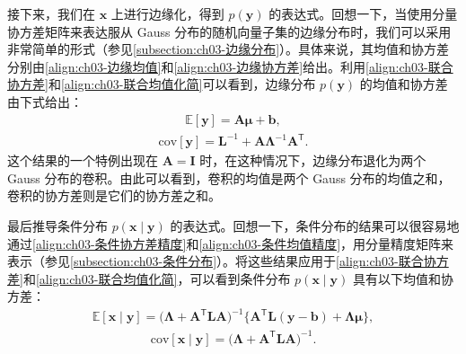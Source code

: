 \documentclass[../../main.tex]{subfiles}
\begin{document}
接下来，我们在 $\boldsymbol{x}$ 上进行边缘化，得到 $p(\boldsymbol{y})$ 的表达式。回想一下，当使用分量协方差矩阵来表达服从 Gauss 分布的随机向量子集的边缘分布时，我们可以采用非常简单的形式（参见\cref{subsection:ch03-边缘分布}）。具体来说，其均值和协方差分别由\eqref{align:ch03-边缘均值}和\eqref{align:ch03-边缘协方差}给出。利用\eqref{align:ch03-联合协方差}和\eqref{align:ch03-联合均值化简}可以看到，边缘分布 $p(\boldsymbol{y})$ 的均值和协方差由下式给出：
\begin{align}
\mathbb{E}[\boldsymbol{y}]=\boldsymbol{A}\boldsymbol{\mu}+\boldsymbol{b},
\label{align:ch03-边缘Bayes}
\end{align}
\begin{align}
\mathrm{cov}[\boldsymbol{y}]=\boldsymbol{L}^{-1}+\boldsymbol{A}\boldsymbol{\Lambda}^{-1}\boldsymbol{A}^{\mathsf{T}}.
\label{align:ch03-边缘Bayes协方差}
\end{align}
这个结果的一个特例出现在 $\boldsymbol{A}=\boldsymbol{I}$ 时，在这种情况下，边缘分布退化为两个 Gauss 分布的卷积。由此可以看到，卷积的均值是两个 Gauss 分布的均值之和，卷积的协方差则是它们的协方差之和。

最后推导条件分布 $p(\boldsymbol{x}\mid\boldsymbol{y})$ 的表达式。回想一下，条件分布的结果可以很容易地通过\eqref{align:ch03-条件协方差精度}和\eqref{align:ch03-条件均值精度}，用分量精度矩阵来表示（参见\cref{subsection:ch03-条件分布}）。将这些结果应用于\eqref{align:ch03-联合协方差}和\eqref{align:ch03-联合均值化简}，可以看到条件分布 $p(\boldsymbol{x}\mid\boldsymbol{y})$ 具有以下均值和协方差：
\begin{align}
\mathbb{E}[\boldsymbol{x}\mid\boldsymbol{y}]=\bigl(\boldsymbol{\Lambda}+\boldsymbol{A}^{\mathsf{T}}\boldsymbol{L}\boldsymbol{A}\bigr)^{-1}\bigl\{\boldsymbol{A}^{\mathsf{T}}\boldsymbol{L}(\boldsymbol{y}-\boldsymbol{b})+\boldsymbol{\Lambda}\boldsymbol{\mu}\bigr\},
\label{align:ch03-后验均值}
\end{align}
\begin{align}
\mathrm{cov}[\boldsymbol{x}\mid\boldsymbol{y}]=\bigl(\boldsymbol{\Lambda}+\boldsymbol{A}^{\mathsf{T}}\boldsymbol{L}\boldsymbol{A}\bigr)^{-1}.
\label{align:ch03-后验协方差}
\end{align}
\end{document}
